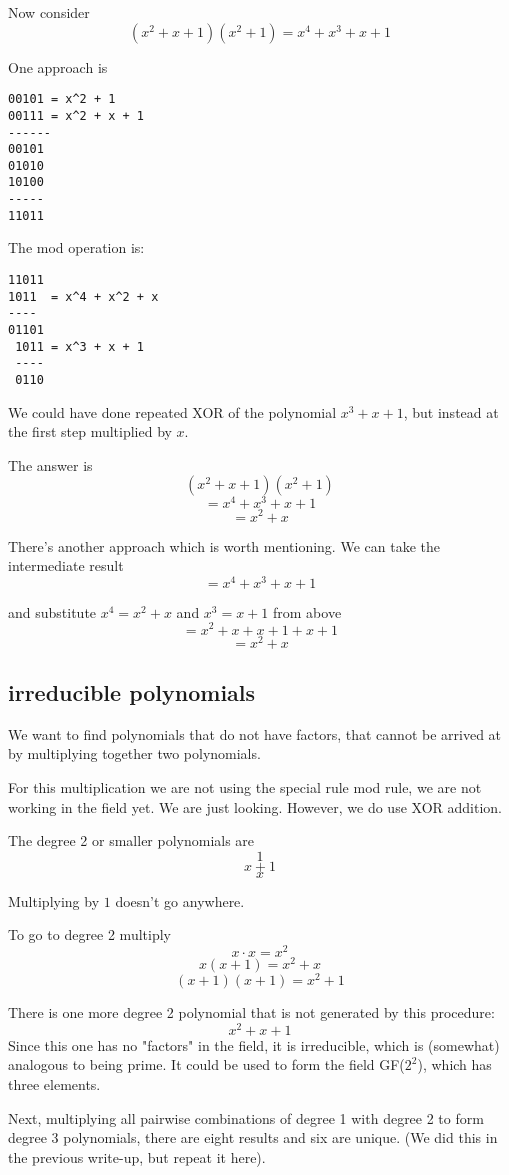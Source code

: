 \documentclass[11pt, oneside]{article}
\begin{document}
Now consider 
\[ (x^2 + x + 1)(x^2 + 1) = x^4 + x^3 + x + 1 \]

One approach is

\begin{verbatim}
00101 = x^2 + 1
00111 = x^2 + x + 1
------
00101
01010
10100
-----
11011
\end{verbatim}

The mod operation is:

\begin{verbatim}
11011
1011  = x^4 + x^2 + x
----
01101
 1011 = x^3 + x + 1
 ----
 0110
 \end{verbatim}
 
We could have done repeated XOR of the polynomial $x^3 + x + 1$, but instead at the first step multiplied by $x$.

The answer is 
\[ (x^2 + x + 1)(x^2 + 1) \]
\[ = x^4 + x^3 + x + 1 \]
\[ = x^2 + x \] 

There's another approach which is worth mentioning.  We can take the intermediate result
\[ = x^4 + x^3 + x + 1 \]

and substitute $x^4 = x^2 + x$ and $x^3 = x + 1$ from above
\[ = x^2 + x + x + 1 + x + 1 \]
\[ = x^2 + x \]

\subsection*{irreducible polynomials}
We want to find polynomials that do not have factors, that cannot be arrived at by multiplying together two polynomials.

For this multiplication we are not using the special rule mod rule, we are not working in the field yet.  We are just looking.  However, we do use XOR addition.

The degree 2 or smaller polynomials are
\[ 1 \]
\[ x + 1 \]
\[ x \]

Multiplying by $1$ doesn't go anywhere.

To go to degree 2 multiply 
\[ x \cdot x = x^2 \]
\[ x(x + 1) = x^2 + x \]
\[ (x + 1)(x + 1) = x^2 + 1 \]

There is one more degree 2 polynomial that is not generated by this procedure:
\[ x^2 + x + 1 \]
Since this one has no "factors" in the field, it is irreducible, which is (somewhat) analogous to being prime.  It could be used to form the field GF($2^2$), which has three elements.

Next, multiplying all pairwise combinations of degree 1 with degree 2 to form degree 3 polynomials, there are eight results and six are unique.  (We did this in the previous write-up, but repeat it here).
\end{document}
